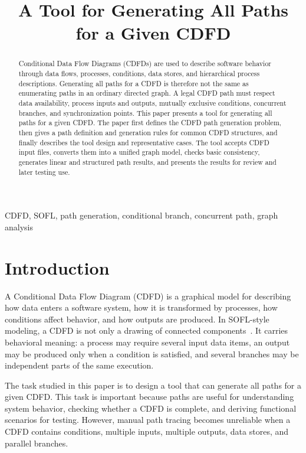 \documentclass[conference]{template/IEEEtran}
\title{A Tool for Generating All Paths for a Given CDFD}
\author{
\IEEEauthorblockN{Lu Lu, Xue Cao, Yin Jiang, Sheng Li}
\IEEEauthorblockA{
The School of Computer Engineering and Science, Shanghai University\\
Email: \{3124619159@qq.com, 18136572867@163.com, jiangy03@shu.edu.cn, lisheng226735@163.com\}}
}
\begin{document}
\maketitle

\begin{abstract}
Conditional Data Flow Diagrams (CDFDs) are used to describe software behavior through data flows, processes, conditions, data stores, and hierarchical process descriptions. Generating all paths for a CDFD is therefore not the same as enumerating paths in an ordinary directed graph. A legal CDFD path must respect data availability, process inputs and outputs, mutually exclusive conditions, concurrent branches, and synchronization points. This paper presents a tool for generating all paths for a given CDFD. The paper first defines the CDFD path generation problem, then gives a path definition and generation rules for common CDFD structures, and finally describes the tool design and representative cases. The tool accepts CDFD input files, converts them into a unified graph model, checks basic consistency, generates linear and structured path results, and presents the results for review and later testing use.
\end{abstract}

\begin{IEEEkeywords}
CDFD, SOFL, path generation, conditional branch, concurrent path, graph analysis
\end{IEEEkeywords}

\section{Introduction}

A Conditional Data Flow Diagram (CDFD) is a graphical model for describing how data enters a software system, how it is transformed by processes, how conditions affect behavior, and how outputs are produced. In SOFL-style modeling, a CDFD is not only a drawing of connected components~\cite{liu1998sofl,liu2013formal}. It carries behavioral meaning: a process may require several input data items, an output may be produced only when a condition is satisfied, and several branches may be independent parts of the same execution.

The task studied in this paper is to design a tool that can generate all paths for a given CDFD. This task is important because paths are useful for understanding system behavior, checking whether a CDFD is complete, and deriving functional scenarios for testing. However, manual path tracing becomes unreliable when a CDFD contains conditions, multiple inputs, multiple outputs, data stores, and parallel branches.
\end{document}
